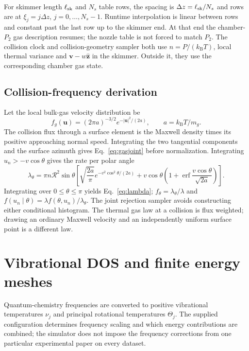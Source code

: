 \documentclass[10pt,a4paper]{article}
\newcommand{\kb}{k_{\mathrm B}}
\newcommand{\erf}{\operatorname{erf}}
\begin{document}
For skimmer length $\ell_{\rm sk}$ and $N_s$ table rows, the spacing is
$\Delta z=\ell_{\rm sk}/N_s$ and rows are at $\xi_j=j\Delta z$,
$j=0,\ldots,N_s-1$. Runtime interpolation is linear between rows and constant
past the last row up to the skimmer end. At that end the chamber-$P_2$ gas
description resumes; the nozzle table is not forced to match $P_2$.
The collision clock and collision-geometry sampler both use
$n=P/(\kb T)$, local thermal variance and $\mathbf v-w\hat{\mathbf z}$
in the skimmer. Outside it, they use the corresponding chamber gas state.

\subsection{Collision-frequency derivation}
Let the local bulk-gas velocity distribution be
\[
 f_g(\mathbf u)=(2\pi a)^{-3/2}e^{-|\mathbf u|^2/(2a)},\qquad
 a=\kb T/m_g.
\]
The collision flux through a surface element is the Maxwell density times its
positive approaching normal speed. Integrating the two tangential components
and the surface azimuth gives Eq.~\eqref{eq:gasjoint} before normalization.
Integrating $u_n>-v\cos\theta$ gives the rate per polar angle
\begin{equation}
 \lambda_\theta=\pi n\mathcal R^2\sin\theta
 \left[
 \sqrt{\frac{2a}{\pi}}e^{-v^2\cos^2\theta/(2a)}
 +v\cos\theta\left(1+\erf\frac{v\cos\theta}{\sqrt{2a}}\right)
 \right].
\end{equation}
Integrating over $0\leq\theta\leq\pi$ yields Eq.~\eqref{eq:lambda};
$f_\theta=\lambda_\theta/\lambda$ and
$f(u_n\mid\theta)=\lambda f(\theta,u_n)/\lambda_\theta$.
The joint rejection sampler avoids constructing either conditional histogram.
The thermal gas law at a collision is flux weighted; drawing an ordinary
Maxwell velocity and an independently uniform surface point is a different law.

\clearpage
\section{Vibrational DOS and finite energy meshes}\label{app:dos}
Quantum-chemistry frequencies are converted to positive vibrational temperatures
$\nu_j$ and principal rotational temperatures $\Theta_j$. The supplied
configuration determines frequency scaling and which energy contributions are
combined; the simulator does not impose the frequency corrections from one
particular experimental paper on every dataset.
\end{document}
